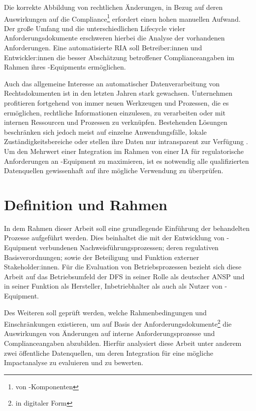     \medskip
    Die korrekte Abbildung von rechtlichen Änderungen, in Bezug auf deren Auswirkungen auf die Compliance\footnote{von \atmans{}-Komponenten} erfordert einen hohen manuellen Aufwand.
    Der große Umfang und die unterschiedlichen Lifecycle vieler Anforderungsdokumente erschweren hierbei die Analyse der vorhandenen Anforderungen.
    Eine automatisierte \ac{RIA} soll Betreiber:innen und Entwickler:innen die besser Abschätzung betroffener Complianceangaben im Rahmen ihres \atmans-Equipments ermöglichen.

    \medskip
    Auch das allgemeine Interesse an automatischer Datenverarbeitung von Rechtsdokumenten ist in den letzten Jahren stark gewachsen.
    Unternehmen profitieren fortgehend von immer neuen Werkzeugen und Prozessen, die es ermöglichen, rechtliche Informationen einzulesen, zu verarbeiten oder mit internen Ressourcen und Prozessen zu verknüpfen.
    Bestehenden Lösungen beschränken sich jedoch meist auf einzelne Anwendungsfälle, lokale Zuständigkeitsbereiche oder stellen ihre Daten nur intransparent zur Verfügung \cite[385]{eu_open_legal_info}. 
    Um den Mehrwert einer Integration im Rahmen von einer \ac{IA} für regulatorische Anforderungen an \atmans-Equipment zu maximieren, ist es notwendig alle qualifizierten Datenquellen gewissenhaft auf ihre mögliche Verwendung zu überprüfen. 
        
\pagebreak
\section{Definition und Rahmen}

    In dem Rahmen dieser Arbeit soll eine grundlegende Einführung der behandelten Prozesse aufgeführt werden.
    Dies beinhaltet die mit der Entwicklung von \atmans{}-Equipment verbundenen Nachweisführungsprozessen; deren regulativen Basisverordnungen; sowie der Beteiligung und Funktion externer Stakeholder:innen.
    Für die Evaluation von Betriebsprozessen bezieht sich diese Arbeit auf das Betriebsumfeld der \ac{DFS} in seiner Rolle als deutscher \ac{ANSP} und in seiner Funktion als Hersteller, Inbetriebhalter als auch als Nutzer von \atmans-Equipment.

    \medskip
    Des Weiteren soll geprüft werden, welche Rahmenbedingungen und Einschränkungen existieren, um auf Basis der Anforderungsdokumente\footnote{in digitaler Form} die Auswirkungen von Änderungen auf interne Anforderungsprozesse und Complianceangaben abzubilden.
    Hierfür analysiert diese Arbeit unter anderem zwei öffentliche Datenquellen, um deren Integration für eine mögliche Impactanalyse zu evaluieren und zu bewerten.
    
